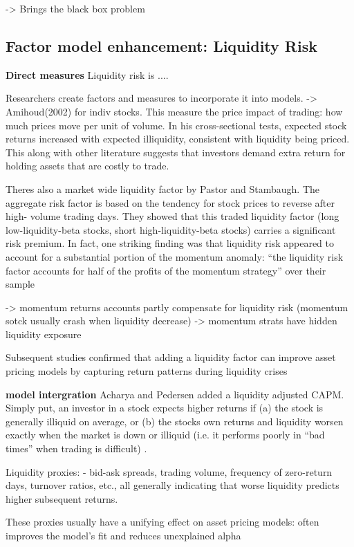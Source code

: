 -> Brings the black box problem


\subsection{Factor model enhancement: Liquidity Risk}

\textbf{Direct measures}
Liquidity risk is .... 

Researchers create factors and measures to incorporate it into models. -> Amihoud(2002) for indiv stocks. This measure the price impact of trading: how much prices move per unit of volume. In his cross-sectional tests, expected stock returns increased with expected illiquidity, consistent with liquidity being priced. This along with other literature suggests that investors demand extra return for holding assets that are costly to trade.

Theres also a market wide liquidity factor by Pastor and Stambaugh. The aggregate risk factor is based on the tendency for stock prices to reverse after high- volume trading days. They showed that this traded liquidity factor (long low-liquidity-beta stocks, short high-liquidity-beta stocks) carries a significant risk premium. In fact, one striking finding was that liquidity risk appeared to account for a substantial portion of the momentum anomaly: “the liquidity risk factor accounts for half of the profits of the momentum strategy” over their sample

-> momentum returns accounts partly compensate for liquidity risk (momentum sotck usually crash when liquidity decrease) -> momentum strats have hidden liquidity exposure

Subsequent studies confirmed that adding a liquidity factor can improve asset pricing models by capturing return patterns during liquidity crises

\textbf{model intergration}
Acharya and Pedersen added a liquidity adjusted CAPM. Simply put, an investor in a stock expects higher returns if (a) the stock is generally illiquid on average, or (b) the stocks own returns and liquidity worsen exactly when the market is down or illiquid (i.e. it performs poorly in “bad times” when trading is difficult) . 

Liquidity proxies:
- bid-ask spreads, trading volume, frequency of zero-return days, turnover ratios, etc., all generally indicating that worse liquidity predicts higher subsequent returns.

These proxies usually have a unifying effect on asset pricing models: often improves the model’s fit and reduces unexplained alpha

